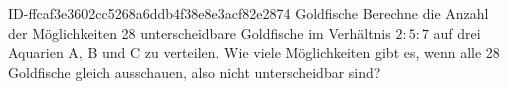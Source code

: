 \begin{exercise}
      {ID-ffcaf3e3602cc5268a6ddb4f38e8e3acf82e2874}
      {Goldfische}
  \ifproblem\problem
    Berechne die Anzahl der Möglichkeiten 28 unterscheidbare Goldfische im
    Verhältnis $2:5:7$ auf drei Aquarien A, B und C zu verteilen. Wie viele
    Möglichkeiten gibt es, wenn alle 28 Goldfische gleich ausschauen, also
    nicht unterscheidbar sind?
  \fi
\end{exercise}
